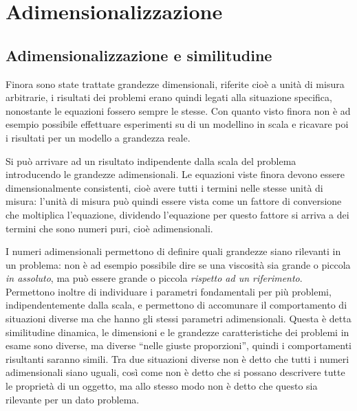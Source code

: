 %
\section{Adimensionalizzazione}
\subsection{Adimensionalizzazione e similitudine}
Finora sono state trattate grandezze dimensionali, riferite cioè a unità di misura arbitrarie, i risultati dei problemi erano quindi legati alla situazione specifica, nonostante le equazioni fossero sempre le stesse.
Con quanto visto finora non è ad esempio possibile effettuare esperimenti su di un modellino in scala e ricavare poi i risultati per un modello a grandezza reale.

Si può arrivare ad un risultato indipendente dalla scala del problema introducendo le grandezze adimensionali.
Le equazioni viste finora devono essere dimensionalmente consistenti, cioè avere tutti i termini nelle stesse unità di misura: l'unità di misura può quindi essere vista come un fattore di conversione che moltiplica l'equazione, dividendo l'equazione per questo fattore si arriva a dei termini che sono numeri puri, cioè adimensionali.

I numeri adimensionali permettono di definire quali grandezze siano rilevanti in un problema: non è ad esempio possibile dire se una viscosità sia grande o piccola \textit{in assoluto}, ma può essere grande o piccola \textit{rispetto ad un riferimento}.
Permettono inoltre di individuare i parametri fondamentali per più problemi, indipendentemente dalla scala, e permettono di accomunare il comportamento di situazioni diverse ma che hanno gli stessi parametri adimensionali.
Questa è detta similitudine dinamica, le dimensioni e le grandezze caratteristiche dei problemi in esame sono diverse, ma diverse ``nelle giuste proporzioni'', quindi i comportamenti risultanti saranno simili.
Tra due situazioni diverse non è detto che tutti i numeri adimensionali siano uguali, così come non è detto che si possano descrivere tutte le proprietà di un oggetto, ma allo stesso modo non è detto che questo sia rilevante per un dato problema.

